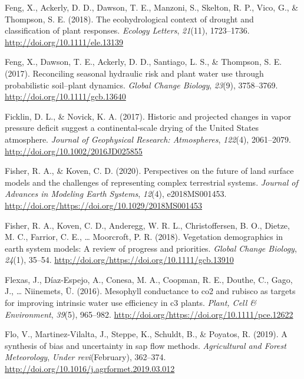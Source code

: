 \documentclass[11pt,twoside]{reedthesis}
\begin{document}
\hypertarget{ref-feng_ecohydrological_2018}{}
Feng, X., Ackerly, D. D., Dawson, T. E., Manzoni, S., Skelton, R. P.,
Vico, G., \& Thompson, S. E. (2018). The ecohydrological context of
drought and classification of plant responses. \emph{Ecology Letters},
\emph{21}(11), 1723--1736. \url{http://doi.org/10.1111/ele.13139}

\hypertarget{ref-feng_reconciling_2017}{}
Feng, X., Dawson, T. E., Ackerly, D. D., Santiago, L. S., \& Thompson,
S. E. (2017). Reconciling seasonal hydraulic risk and plant water use
through probabilistic soil--plant dynamics. \emph{Global Change
Biology}, \emph{23}(9), 3758--3769.
\url{http://doi.org/10.1111/gcb.13640}

\hypertarget{ref-ficklin_historic_2017}{}
Ficklin, D. L., \& Novick, K. A. (2017). Historic and projected changes
in vapor pressure deficit suggest a continental‐scale drying of the
United States atmosphere. \emph{Journal of Geophysical Research:
Atmospheres}, \emph{122}(4), 2061--2079.
\url{http://doi.org/10.1002/2016JD025855}

\hypertarget{ref-Fisher2020}{}
Fisher, R. A., \& Koven, C. D. (2020). Perspectives on the future of
land surface models and the challenges of representing complex
terrestrial systems. \emph{Journal of Advances in Modeling Earth
Systems}, \emph{12}(4), e2018MS001453.
\url{http://doi.org/https://doi.org/10.1029/2018MS001453}

\hypertarget{ref-Fisher2018}{}
Fisher, R. A., Koven, C. D., Anderegg, W. R. L., Christoffersen, B. O.,
Dietze, M. C., Farrior, C. E., \ldots{} Moorcroft, P. R. (2018).
Vegetation demographics in earth system models: A review of progress and
priorities. \emph{Global Change Biology}, \emph{24}(1), 35--54.
\url{http://doi.org/https://doi.org/10.1111/gcb.13910}

\hypertarget{ref-Flexas2015}{}
Flexas, J., Díaz-Espejo, A., Conesa, M. A., Coopman, R. E., Douthe, C.,
Gago, J., \ldots{} Niinemets, Ü. (2016). Mesophyll conductance to co2
and rubisco as targets for improving intrinsic water use efficiency in
c3 plants. \emph{Plant, Cell \& Environment}, \emph{39}(5), 965--982.
\url{http://doi.org/https://doi.org/10.1111/pce.12622}

\hypertarget{ref-Flo2019}{}
Flo, V., Martinez-Vilalta, J., Steppe, K., Schuldt, B., \& Poyatos, R.
(2019). A synthesis of bias and uncertainty in sap flow methods.
\emph{Agricultural and Forest Meteorology}, \emph{Under revi}(February),
362--374. \url{http://doi.org/10.1016/j.agrformet.2019.03.012}
\end{document}
